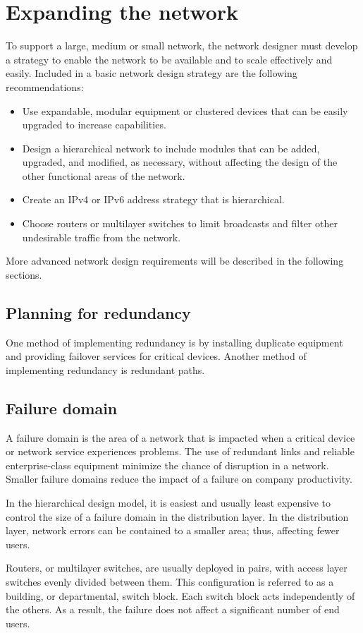 \section{Expanding the network}
To support a large, medium or small network, the network designer must develop a strategy to enable the network to be available and to scale effectively and easily. Included in a basic network design strategy are the following recommendations:
\begin{itemize}
\item Use expandable, modular equipment or clustered devices that can be easily upgraded to increase capabilities. 
\item Design a hierarchical network to include modules that can be added, upgraded, and modified, as necessary, without affecting the design of the other functional areas of the network.
\item Create an IPv4 or IPv6 address strategy that is hierarchical. 
\item Choose routers or multilayer switches to limit broadcasts and filter other undesirable traffic from the network. 
\end{itemize}
More advanced network design requirements will be described in the following sections.
\subsection{Planning for redundancy}
One method of implementing redundancy is by installing duplicate equipment and providing failover services for critical devices. Another method of implementing redundancy is redundant paths.
\subsection{Failure domain}
A failure domain is the area of a network that is impacted when a critical device or network service experiences problems. The use of redundant links and reliable enterprise-class equipment minimize the chance of disruption in a network. Smaller failure domains reduce the impact of a failure on company productivity.\par 
In the hierarchical design model, it is easiest and usually least expensive to control the size of a failure domain in the distribution layer. In the distribution layer, network errors can be contained to a smaller area; thus, affecting fewer users. \par 
Routers, or multilayer switches, are usually deployed in pairs, with access layer switches evenly divided between them. This configuration is referred to as a building, or departmental, switch block. Each switch block acts independently of the others. As a result, the failure does not affect a significant number of end users.
